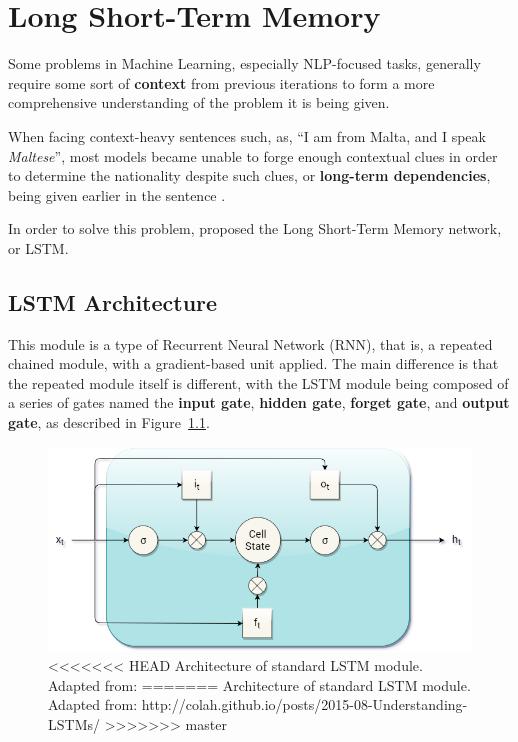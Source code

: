 \chapter{Long Short-Term Memory}
\label{ch:lstm}


Some problems in Machine Learning, especially NLP-focused tasks, generally require some sort of \textbf{context} from previous iterations to form a more comprehensive understanding of the problem it is being given. 

When facing context-heavy sentences such, as, ``I am from Malta, and I speak \textit{Maltese}'', most models became unable to forge enough contextual clues in order to determine the nationality despite such clues, or \textbf{long-term dependencies}, being given earlier in the sentence \citep{bengio94}.

In order to solve this problem, \citet{hochreiter1997long} proposed the Long Short-Term Memory network, or LSTM. 

\section{LSTM Architecture}
This module is a type of Recurrent Neural Network (RNN), that is, a repeated chained module, with a gradient-based unit applied. The main difference is that the repeated module itself is different, with the LSTM module being composed of a series of gates named the \textbf{input gate}, \textbf{hidden gate}, \textbf{forget gate}, and \textbf{output gate}, as described in Figure~\ref{fig:lstm_architecture}.

\begin{figure}
	\centering
	\includegraphics[width=0.6\linewidth]{graphics/lstm/lstm.png}
	\caption{
<<<<<<< HEAD
		Architecture of standard LSTM module. Adapted from: \citet{olah_2015}
=======
		Architecture of standard LSTM module. Adapted from: http://colah.github.io/posts/2015-08-Understanding-LSTMs/
>>>>>>> master
	}
	\label{fig:lstm_architecture}
\end{figure}

